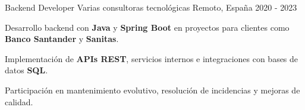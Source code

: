   \cventry
    {Backend Developer}
    {Varias consultoras tecnológicas}
  {Remoto, España}
  {2020 - 2023}
  {
    \begin{cvitems}
      \item {Desarrollo backend con \textbf{Java} y \textbf{Spring Boot} en proyectos para clientes como \textbf{Banco Santander} y \textbf{Sanitas}.}
      \item {Implementación de \textbf{APIs REST}, servicios internos e integraciones con bases de datos \textbf{SQL}.}
      \item {Participación en mantenimiento evolutivo, resolución de incidencias y mejoras de calidad.}
    \end{cvitems}
  }
